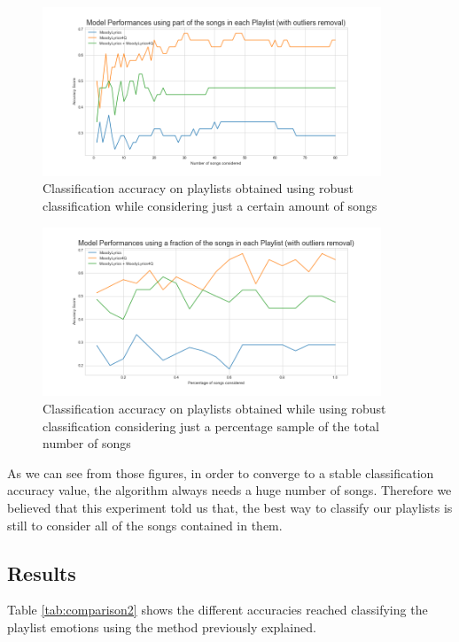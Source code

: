 \begin{figure}[H]
\centering
\includegraphics[width=0.9\textwidth]{./chapters/chapter5/images/subset-absolute-robust}
\caption{Classification accuracy on playlists obtained using robust classification while considering just a certain amount of songs}
\label{fig:subset-absolute-robust}
\end{figure}

\begin{figure}[H]
\centering
\includegraphics[width=0.9\textwidth]{./chapters/chapter5/images/subset-percentage-robust}
\caption{Classification accuracy on playlists obtained while using robust classification considering just a percentage sample of the total number of songs}
\label{fig:subset-percentage-robust}
\end{figure}

As we can see from those figures, in order to converge to a stable classification accuracy value, the algorithm always needs a huge number of songs. Therefore we believed that this experiment told us that, the best way to classify our playlists is still to consider all of the songs contained in them.

\subsection{Results}
Table \ref{tab:comparison2} shows the different accuracies reached classifying the playlist emotions using the method previously explained. 

